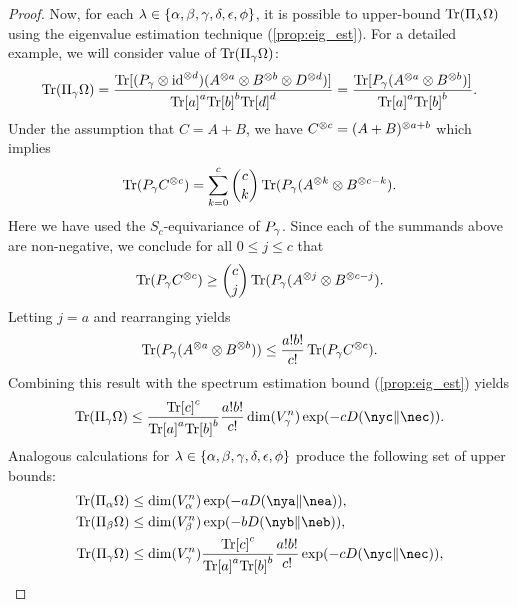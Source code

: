 \documentclass[notitlepage, 10pt]{article}
\begin{document}
\begin{proof}
    Now, for each $\lambda \in \{\alpha, \beta, \gamma, \delta, \epsilon, \phi\}$, it is possible to upper-bound $\operatorname{Tr}(\Pi_{\lambda} \Omega)$ using the eigenvalue estimation technique (\cref{prop:eig_est}).
    For a detailed example, we will consider value of $\operatorname{Tr}(\Pi_{\gamma} \Omega)$:
    \begin{align}
        \operatorname{Tr}(\Pi_{\gamma} \Omega)
        = \frac{\operatorname{Tr}[(P_{\gamma} \otimes \operatorname{id}^{\otimes d})(A^{\otimes a}\otimes B^{\otimes b} \otimes D^{\otimes d})]}{{\operatorname{Tr}[a]}^{a}{\operatorname{Tr}[b]}^{b}{\operatorname{Tr}[d]}^{d}}
        = \frac{\operatorname{Tr}[P_{\gamma}(A^{\otimes a}\otimes B^{\otimes b})]}{{\operatorname{Tr}[a]}^{a}{\operatorname{Tr}[b]}^{b}}.
    \end{align}
    Under the assumption that $C = A+B$, we have $C^{\otimes c} = (A+B)^{\otimes a+b}$ which implies
    \begin{equation}
        \operatorname{Tr}(P_{\gamma} C^{\otimes c}) = \sum_{k=0}^{c} \binom{c}{k} \operatorname{Tr}(P_{\gamma} (A^{\otimes k} \otimes B^{\otimes c-k}).
    \end{equation}
    Here we have used the $S_{c}$-equivariance of $P_{\gamma}$.
    Since each of the summands above are non-negative, we conclude for all $0 \leq j \leq c$ that
    \begin{equation}
        \operatorname{Tr}(P_{\gamma} C^{\otimes c}) \geq \binom{c}{j} \operatorname{Tr}(P_{\gamma} (A^{\otimes j} \otimes B^{\otimes c-j}).
    \end{equation}
    Letting $j = a$ and rearranging yields
    \begin{equation}
        \operatorname{Tr}(P_{\gamma} (A^{\otimes a} \otimes B^{\otimes b})) \leq \frac{a!b!}{c!}\operatorname{Tr}(P_{\gamma} C^{\otimes c}).
    \end{equation}
    Combining this result with the spectrum estimation bound (\cref{prop:eig_est}) yields
    \begin{align}
        \Tr(\Pi_{\yc} \Omega)
        \leq \frac{{\tec}^{c}}{{\tea}^{a}{\teb}^{b}}\frac{a!b!}{c!}\dim(V_{\yc}^{n})\exp(-c\kl{\nyc}{\nec}).
    \end{align}
    Analogous calculations for $\lambda \in \{\alpha, \beta, \gamma, \delta, \epsilon, \phi\}$ produce the following set of upper bounds:
    \begin{align}
        \begin{split}
            \Tr(\Pi_{\ya} \Omega)
            &\leq \dim(V_{\ya}^{n}) \exp(- a \kl{\nya}{\nea}), \\
            \Tr(\Pi_{\yb} \Omega)
            &\leq \dim(V_{\yb}^{n}) \exp(- b \kl{\nyb}{\neb}), \\
            \Tr(\Pi_{\yc} \Omega)
            &\leq \dim(V_{\yc}^{n})\frac{{\tec}^{c}}{{\tea}^{a}{\teb}^{b}}\frac{a!b!}{c!} \exp(- c \kl{\nyc}{\nec}), \\

\end{split}
\end{align}
\end{proof}
\end{document}

